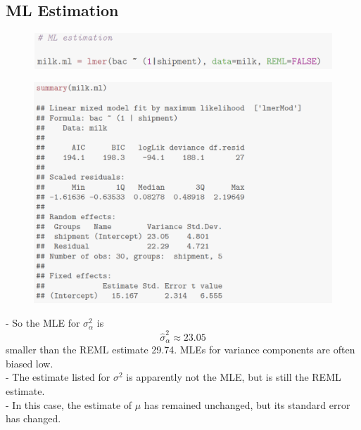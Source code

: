 \documentclass[11pt,a4paper]{article}
\begin{document}
\subsection{ML Estimation}

\begin{center}\begin{figure}[htb]
    \centering
    \includegraphics[scale=0.4]{ML Est1}
    \caption{}
    \label{}
\end{figure}\end{center}
\begin{center}\begin{figure}[htb]
    \centering
    \includegraphics[scale=0.5]{ML Est2}
    \caption{}
    \label{}
\end{figure}\end{center}
- So the MLE for $\sigma_{\alpha}^{2}$ is
$$
\widehat{\sigma}_{\alpha}^{2} \approx 23.05
$$
smaller than the REML estimate 29.74. MLEs for variance components are often biased low.\\
- The estimate listed for $\sigma^{2}$ is apparently not the MLE, but is still the REML estimate.\\
- In this case, the estimate of $\mu$ has remained unchanged, but its standard error has changed.\\
\end{document}

